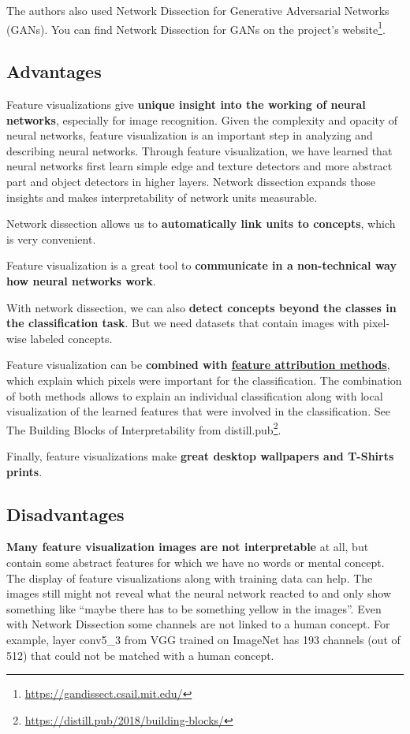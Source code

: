 \documentclass[12pt,]{krantz}
\renewcommand{\href}[2]{#2\footnote{\url{#1}}}
\begin{document}
The authors also used Network Dissection for Generative Adversarial
Networks (GANs). You can find Network Dissection for GANs on
\href{https://gandissect.csail.mit.edu/}{the project's website}.

\subsection{Advantages}\label{advantages-18}

Feature visualizations give \textbf{unique insight into the working of
neural networks}, especially for image recognition. Given the complexity
and opacity of neural networks, feature visualization is an important
step in analyzing and describing neural networks. Through feature
visualization, we have learned that neural networks first learn simple
edge and texture detectors and more abstract part and object detectors
in higher layers. Network dissection expands those insights and makes
interpretability of network units measurable.

Network dissection allows us to \textbf{automatically link units to
concepts}, which is very convenient.

Feature visualization is a great tool to \textbf{communicate in a
non-technical way how neural networks work}.

With network dissection, we can also \textbf{detect concepts beyond the
classes in the classification task}. But we need datasets that contain
images with pixel-wise labeled concepts.

Feature visualization can be \textbf{combined with
\protect\hyperlink{pixel-attribution}{feature attribution methods}},
which explain which pixels were important for the classification. The
combination of both methods allows to explain an individual
classification along with local visualization of the learned features
that were involved in the classification. See
\href{https://distill.pub/2018/building-blocks/}{The Building Blocks of
Interpretability from distill.pub}.

Finally, feature visualizations make \textbf{great desktop wallpapers
and T-Shirts prints}.

\subsection{Disadvantages}\label{disadvantages-18}

\textbf{Many feature visualization images are not interpretable} at all,
but contain some abstract features for which we have no words or mental
concept. The display of feature visualizations along with training data
can help. The images still might not reveal what the neural network
reacted to and only show something like ``maybe there has to be
something yellow in the images''. Even with Network Dissection some
channels are not linked to a human concept. For example, layer conv5\_3
from VGG trained on ImageNet has 193 channels (out of 512) that could
not be matched with a human concept.
\end{document}
